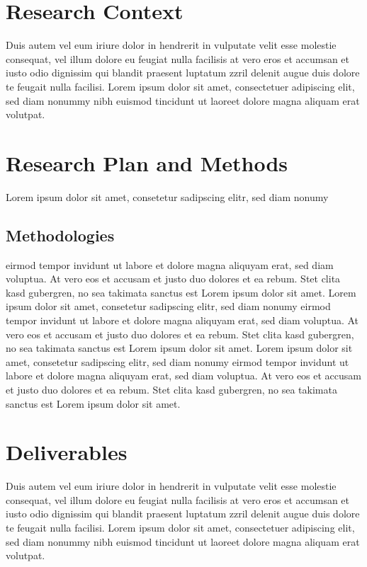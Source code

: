 \documentclass[a4paper,11pt]{article}
\begin{document}
\section{Research Context}
Duis autem vel eum iriure dolor in hendrerit in vulputate velit esse molestie
consequat, vel illum dolore eu feugiat nulla facilisis at vero eros et accumsan
et iusto odio dignissim qui blandit praesent luptatum zzril delenit augue duis
dolore te feugait nulla facilisi. Lorem ipsum dolor sit amet, consectetuer
adipiscing elit, sed diam nonummy nibh euismod tincidunt ut laoreet dolore
magna aliquam erat volutpat.

\section{Research Plan and Methods}
Lorem ipsum dolor sit amet, consetetur sadipscing elitr,  sed diam nonumy
\subsection{Methodologies}
eirmod tempor invidunt ut labore et dolore magna aliquyam erat, sed diam
voluptua. At vero eos et accusam et justo duo dolores et ea rebum. Stet clita
kasd gubergren, no sea takimata sanctus est Lorem ipsum dolor sit amet. Lorem
ipsum dolor sit amet, consetetur sadipscing elitr,  sed diam nonumy eirmod
tempor invidunt ut labore et dolore magna aliquyam erat, sed diam voluptua. At
vero eos et accusam et justo duo dolores et ea rebum. Stet clita kasd
gubergren, no sea takimata sanctus est Lorem ipsum dolor sit amet. Lorem ipsum
dolor sit amet, consetetur sadipscing elitr,  sed diam nonumy eirmod tempor
invidunt ut labore et dolore magna aliquyam erat, sed diam voluptua. At vero
eos et accusam et justo duo dolores et ea rebum. Stet clita kasd gubergren, no
sea takimata sanctus est Lorem ipsum dolor sit amet.

\section{Deliverables}
Duis autem vel eum iriure dolor in hendrerit in vulputate velit esse molestie
consequat, vel illum dolore eu feugiat nulla facilisis at vero eros et accumsan
et iusto odio dignissim qui blandit praesent luptatum zzril delenit augue duis
dolore te feugait nulla facilisi. Lorem ipsum dolor sit amet, consectetuer
adipiscing elit, sed diam nonummy nibh euismod tincidunt ut laoreet dolore
magna aliquam erat volutpat.




\end{document}
